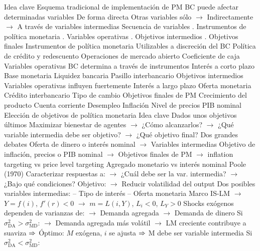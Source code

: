 \documentclass{nuevotema}
\begin{document}
\begin{esquemal}
			\3 Idea clave
				\4 Esquema tradicional de implementación de PM
				\4 BC puede afectar determinadas variables
				\4[] De forma directa
				\4 Otras variables sólo
				\4[] $\to$ Indirectamente
				\4[] $\to$ A través de variables intermedias
				\4 Secuencia de variables
				. Instrumentos de política monetaria
				. Variables operativas
				. Objetivos intermedios
				. Objetivos finales
			\3 Instrumentos de política monetaria
				\4 Utilizables a discreción del BC
				\4[i] Política de crédito y redescuento
				\4[ii] Operaciones de mercado abierto
				\4[iii] Coeficiente de caja
			\3 Variables operativas
				\4[$\to$] BC determina a través de instrumentos
				\4 Interés a corto plazo
				\4 Base monetaria
				\4 Liquidez bancaria
				\4 Pasillo interbancario
			\3 Objetivos intermedios
				\4[$\to$] Variables operativas influyen fuertemente
				\4 Interés a largo plazo
				\4 Oferta monetaria
				\4 Crédito interbancario
				\4 Tipo de cambio
			\3 Objetivos finales de PM
				\4 Crecimiento del producto
				\4 Cuenta corriente
				\4 Desempleo
				\4 Inflación
				\4 Nivel de precios
				\4 PIB nominal
		\2 Elección de objetivos de política monetaria
			\3 Idea clave
				\4 Dados unos objetivos últimos
				\4[] Maximizar bienestar de agentes
				\4[] $\to$ ¿Cómo alcanzarlos?
				\4[] $\to$ ¿Qué variable intermedia debe ser objetivo?
				\4[] $\to$ ¿Qué objetivo final?
				\4 Dos grandes debates
				\4[] Oferta de dinero o interés nominal
				\4[] $\to$ Variables intermedias
				\4[] Objetivo de inflación, precios o PIB nominal
				\4[] $\to$ Objetivos finales de PM
				\4[] $\to$ inflation targeting vs price level targeting
			\3 Agregado monetario vs interés nominal
				\4 Poole (1970)
				\4[] Caracterizar respuestas a:
				\4[] $\to$ ¿Cuál debe ser la var. intermedia?
				\4[] $\to$ ¿Bajo qué condiciones?
				\4[] Objetivo:
				\4[] $\to$ Reducir volatilidad del output
				\4[] Dos posibles variables intermedias:
				\4[] -- Tipo de interés
				\4[] -- Oferta monetaria
				\4 Marco IS-LM
				\4[] $\to$ $Y = f(i)$, $f'(r) < 0$
				\4[] $\to$ $m = L(i, Y)$, $L_i < 0$, $L_Y > 0$
				\4[] Shocks exógenos dependen de varianzas de:
				\4[] $\to$ Demanda agregada
				\4[] $\to$ Demanda de dinero
				\4[] Si $\sigma^2_\text{DA} > \sigma_\text{MD}^2$:
				\4[] $\to$ Demanda agregada más volátil
				\4[] $\to$ LM creciente contribuye a suaviza
				\4[] $\Rightarrow$ Óptimo: $M$ exógena, $i$ se ajusta
				\4[] $\Rightarrow$ M debe ser variable intermedia
				\4[] 
				\4[] Si $\sigma^2_\text{DA} < \sigma_\text{MD}^2$:

\end{esquemal}
\end{document}
